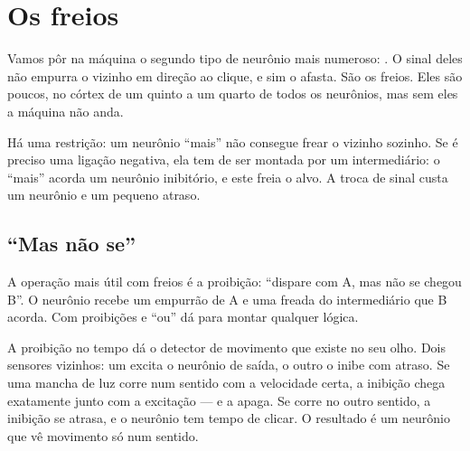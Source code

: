 \chapter{Os freios}

Vamos pôr na máquina o segundo tipo de neurônio mais numeroso: . O sinal deles não empurra o vizinho em direção ao clique, e sim o afasta. São os freios. Eles são poucos, no córtex de um quinto a um quarto de todos os neurônios, mas sem eles a máquina não anda.

Há uma restrição: um neurônio ``mais'' não consegue frear o vizinho sozinho. Se é preciso uma ligação negativa, ela tem de ser montada por um intermediário: o ``mais'' acorda um neurônio inibitório, e este freia o alvo. A troca de sinal custa um neurônio e um pequeno atraso.

\section*{``Mas não se''}

A operação mais útil com freios é a proibição: ``dispare com A, mas não se chegou B''. O neurônio recebe um empurrão de A e uma freada do intermediário que B acorda. Com proibições e ``ou'' dá para montar qualquer lógica.


A proibição no tempo dá o detector de movimento que existe no seu olho. Dois sensores vizinhos: um excita o neurônio de saída, o outro o inibe com atraso. Se uma mancha de luz corre num sentido com a velocidade certa, a inibição chega exatamente junto com a excitação --- e a apaga. Se corre no outro sentido, a inibição se atrasa, e o neurônio tem tempo de clicar. O resultado é um neurônio que vê movimento só num sentido.

